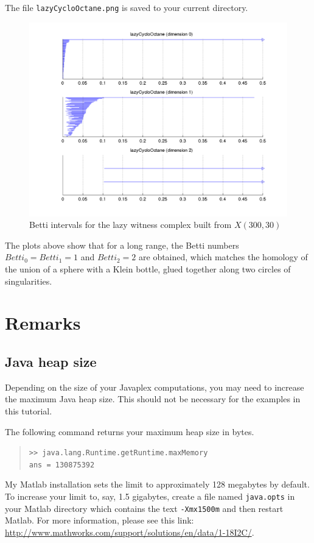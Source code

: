 \documentclass[amscd, amssymb, verbatim]{amsart}[12pt]
\theoremstyle{remark}
\theoremstyle{remark}
\theoremstyle{remark}
\begin{document}
The file \texttt{lazyCycloOctane.png} is saved to your current directory.

\begin{figure}[htp]
	\begin{center}
    	\includegraphics[width=6in]{lazyCycloOctane.png}
   	\end{center}
	\caption{Betti intervals for the lazy witness complex built from $X(300,30)$}
  	\label{fig:rangeBetti}
\end{figure}
\FloatBarrier

The plots above show that for a long range, the Betti numbers $Betti_0 = Betti_1 = 1$ and $Betti_2 = 2$ are obtained, which matches the homology of the union of a sphere with a Klein bottle, glued together along two circles of singularities.



\section{Remarks} 


\subsection{Java heap size}\label{SS:java-heap-size}
Depending on the size of your Javaplex computations, you may need to increase the maximum Java heap size. This should not be necessary for the examples in this tutorial.

The following command returns your maximum heap size in bytes.
\begin{quote} \texttt{>> java.lang.Runtime.getRuntime.maxMemory\\
ans = 130875392
} \end{quote}
My Matlab installation sets the limit to approximately 128 megabytes by default. To increase your limit to, say, 1.5 gigabytes, create a file named \texttt{java.opts} in your Matlab directory which contains the text \texttt{-Xmx1500m} and then restart Matlab. For more information, please see this link: \url{http://www.mathworks.com/support/solutions/en/data/1-18I2C/}.
\end{document}
